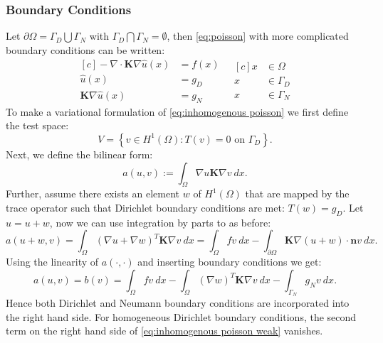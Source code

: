 \documentclass[../Main/main.tex]{subfiles}
\begin{document}
	\subsubsection*{Boundary Conditions}
	Let $\partial \Omega = \Gamma_D\bigcup \Gamma_N$ with $\Gamma_D \bigcap \Gamma_N = \emptyset$, then \eqref{eq:poisson} with more complicated boundary conditions can be written:
	\begin{equation}\label{eq:inhomogenous poisson}
		\begin{aligned}[c]
			 - \nabla \cdot \bm{K} \nabla \hat{u}(x) &= f(x) \\
			\hat{u}(x) &= g_D \\
			\bm{K}\nabla \hat{u}(x) &= g_N
		\end{aligned}
		\ \ \
		\begin{aligned}[c]
			x &\in \Omega  \\
			x &\in \Gamma_D \\
			x &\in \Gamma_N
		\end{aligned}
	\end{equation}
	To make a variational formulation of \eqref{eq:inhomogenous poisson} we first define the test space:
	\begin{equation*}
		V = \left \{ v\in H^1(\Omega): T(v)=0 \text{ on }\Gamma_D\right \}.
	\end{equation*}
	Next, we define the bilinear form:
	\begin{equation}
		a(u,v) := \int_{\Omega} \nabla u \bm{K} \nabla v \ dx.
	\end{equation}
	Further, assume there exists an element $w$ of $ H^1(\Omega)$ that are mapped by the trace operator such that Dirichlet boundary conditions are met: $T(w)=g_D$. Let $\hat{u} = u+w$, now we can use integration by parts to as before:
	\begin{equation}
		a(u+w,v) = \int_{\Omega}(\nabla u+\nabla w)^{T}\bm{K} \nabla v \ dx = \int_{\Omega}fv \ dx -\int_{\partial\Omega}\bm{K}\nabla (u+w)\cdot \bm{n}v \ dx .
	\end{equation}
	Using the linearity of $a(\cdot,\cdot)$ and inserting boundary conditions we get:
	\begin{equation}\label{eq:inhomogenous poisson weak}
		a(u,v) = b(v)= \int_{\Omega} fv \ dx - \int_{\Omega}(\nabla w)^T\bm{K} \nabla v \ dx - \int_{\Gamma_N} g_N v \ dx.
	\end{equation}
	Hence both Dirichlet and Neumann boundary conditions are incorporated into the right hand side. For homogeneous Dirichlet boundary conditions, the second term on the right hand side of \eqref{eq:inhomogenous poisson weak} vanishes. 
	
\end{document}
